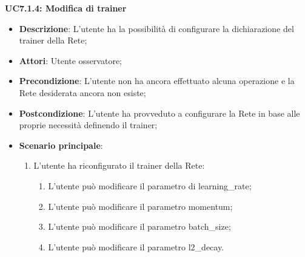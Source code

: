 \textbf{UC7.1.4: Modifica di trainer}
\label{UC7.1.4: Modifica di trainer}
\noindent
\begin{itemize}
\item \textbf{Descrizione}: L'utente ha la possibilit\`a di configurare la dichiarazione del trainer della Rete;
\item \textbf{Attori}: Utente osservatore;
\item \textbf{Precondizione}: L'utente non ha ancora effettuato alcuna operazione e la Rete desiderata ancora non esiste;
\item \textbf{Postcondizione}: L'utente ha provveduto a configurare la Rete in base alle proprie necessit\`a definendo il trainer;
\item \textbf{Scenario principale}:
\begin{enumerate}
\item L'utente ha riconfigurato il trainer della Rete:
\begin{enumerate}
\item L'utente pu\`o modificare il parametro di learning\_rate;
\item L'utente pu\`o modificare il parametro momentum;
\item L'utente pu\`o modificare il parametro batch\_size;
\item L'utente pu\`o modificare il parametro l2\_decay.
\end{enumerate}
\end{enumerate}
\end{itemize}

